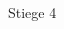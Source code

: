 \documentclass[a4paper]{article}
\begin{document}
\printGenericVSLHeader
\begin{center}
\begin{vsltext}{3cm}{3.5cm}

    \vspace{3cm}

    \Stair{2cm} Stiege 4

\end{vsltext}
\end{center}
\end{document}
